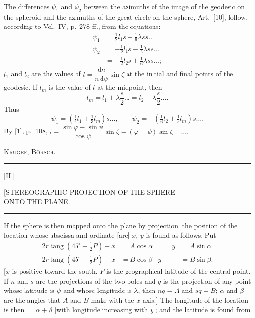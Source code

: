 The differences $\psi_1$ and $\psi_2$ between the azimuths of the image of the geodesic on the spheroid and the azimuths of the great circle on the sphere, Art.~[10], follow, according to Vol.~IV, p.~278 ff., from the equations:
\[
\begin{aligned}
\psi_1&=\tfrac12l_1s+\tfrac16\lambda ss\ldots\\
\psi_2&=-\tfrac12l_1s-\tfrac13\lambda ss\ldots\\
&=-\tfrac12l_2s+\tfrac16\lambda ss\ldots;
\end{aligned}
\]
$l_1$ and $l_2$ are the values of $l=\dfrac{\mathrm dn}{n\,\mathrm d\psi}\sin\zeta$ at the initial and final points of the geodesic. If $l_m$ is the value of $l$ at the midpoint, then
\[
l_m=l_1+\lambda\frac s2\ldots=l_2-\lambda\frac s2\ldots.
\]
Thus
\[
\psi_1=(\tfrac16l_1+\tfrac13l_m)s\ldots,\qquad\psi_2=-(\tfrac16l_2+\tfrac13l_m)s\ldots.
\]
By [1], p.~108, $l=\dfrac{\sin\varphi-\sin\psi}{\cos\psi}\sin\zeta=(\varphi-\psi)\sin\zeta-\ldots.$\par
\noindent\hfill\textsc{Krüger, Börsch.}\par
\par\endgroup
\vfill\begin{center}\rule{.24\textwidth}{.4pt}\end{center}
\clearpage
\begin{center}
[II.]\par\bigskip
{\large [STEREOGRAPHIC PROJECTION OF THE SPHERE\\ONTO THE PLANE.]}\par\bigskip
\rule{.1\textwidth}{.4pt}\par\bigskip
[1.]
\end{center}
If the sphere is then mapped onto the plane by  projection, the position of the location whose abscissa and ordinate [are] $x$, $y$ is found as follows. Put
\[
\begin{aligned}
2r\operatorname{tang}(45^\circ-\tfrac12P)+x&=A\cos\alpha&\qquad y&=A\sin\alpha\\
2r\operatorname{tang}(45^\circ+\tfrac12P)-x&=B\cos\beta&y&=B\sin\beta.
\end{aligned}
\]
[$x$ is positive toward the south. $P$ is the geographical latitude of the central point. If $n$ and $s$ are the projections of the two poles and $q$ is the projection of any point whose latitude is $\psi$ and whose longitude is $\lambda$, then $nq=A$ and $sq=B$; $\alpha$ and $\beta$ are the angles that $A$ and $B$ make with the $x$-axis.] The longitude of the location is then $=\alpha+\beta$ [with longitude increasing with $y$]; and the latitude is found from
